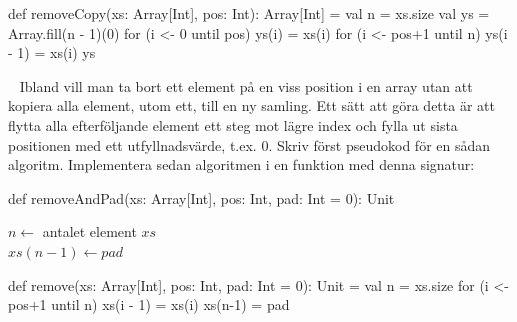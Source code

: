 \begin{Code}
def removeCopy(xs: Array[Int], pos: Int): Array[Int] = {
  val n = xs.size
  val ys = Array.fill(n - 1)(0)
  for (i <- 0 until pos) ys(i) = xs(i)
  for (i <- pos+1 until n) ys(i - 1) = xs(i)
  ys
}
\end{Code}

\QUESTEND





\QUESTBEGIN

\Task  \what~  Ibland vill man ta bort ett element på en viss position i en array utan att kopiera alla element, utom ett, till en ny samling. Ett sätt att göra detta är att flytta alla efterföljande element ett steg mot lägre index och fylla ut sista positionen med ett utfyllnadsvärde, t.ex. $0$.
Skriv först pseudokod för en sådan algoritm. Implementera sedan algoritmen i en funktion med denna signatur:
\begin{Code}
def removeAndPad(xs: Array[Int], pos: Int, pad: Int = 0): Unit
\end{Code}

\SOLUTION

\TaskSolved \what

\begin{algorithm}[H]

 $n \leftarrow$ antalet element $xs$\\
 $xs(n - 1) \leftarrow pad$ \\
\end{algorithm}

\begin{Code}
def remove(xs: Array[Int], pos: Int, pad: Int = 0): Unit = {
  val n = xs.size
  for (i <- pos+1 until n) xs(i - 1) = xs(i)
  xs(n-1) = pad
}
\end{Code}

\QUESTEND





\QUESTBEGIN

\Task  \what~

